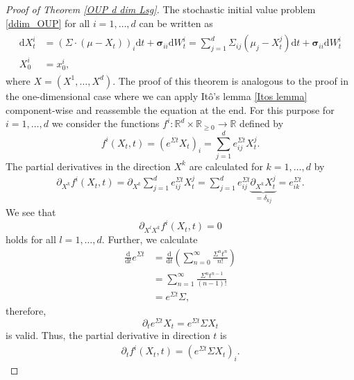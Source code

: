 \documentclass[11pt,titlepage]{article}
\newcommand{\R}{\mathbb{R}} %
\theoremstyle{definition}
\theoremstyle{remark}
\begin{document}
	\begin{proof}[Proof of Theorem \ref{OUP d dim Lsg}]
		The stochastic initial value problem 
		\ref{ddim_OUP} for all $i=1,\ldots,d$ can be written as
		\begin{align}
			\begin{split}
				\mathrm{d}X_t^i &= (\Sigma\cdot (\mu-X_t))_i\mathrm{d}t +\boldsymbol{\sigma}_{ii} \mathrm{d}W_t^i
				=\sum_{j=1}^d \Sigma_{ij}(\mu_j-X_t^j)\mathrm{d}t+\boldsymbol{\sigma}_{ii} \mathrm{d}W_t^i\\
				X_0^i&=x_0^i, \label{ddim_OUP_komponentenweise}
			\end{split}
		\end{align}
		where $X = (X^1,\ldots,X^d)$. 
		The proof of this theorem is analogous to the proof in the one-dimensional case where we can apply Itô's lemma \ref{Itos lemma} component-wise and reassemble the equation at the end. 
		For this purpose for $i=1,\ldots,d$ we consider the functions 
		$f^i:\R^d\times \R_{\geq 0}\to\R$ defined by 
		\[f^i(X_t,t)=(e^{\Sigma t}X_t)_i = \sum_{j=1}^d e^{\Sigma t}_{ij}X_t^j.\]
		The partial derivatives in the direction $X^k$ are calculated for $k=1,\ldots,d$ by
		\begin{align}
			\partial_{X^k}f^i(X_t,t)=\partial_{X^k}\sum_{j=1}^d e^{\Sigma t}_{ij}X_t^j
			=\sum_{j=1}^d e^{\Sigma t}_{ij}\underbrace{\partial_{X^k}X_t^j}_{=\delta_{kj}}
			=e^{\Sigma t}_{ik}. \label{ito_part_abl1}
		\end{align}
		We see that
		\[\partial_{X^l X^k}f^i(X_t,t)=0\]
		holds for all $l=1,\ldots,d$. Further, we calculate
		\begin{align*}
			\frac{\mathrm{d}}{\mathrm{d}t} e^{\Sigma t} &= \frac{\mathrm{d}}{\mathrm{d}t} \left(\sum_{n=0}^{\infty} \frac{\Sigma^n t^n}{n!}\right) \\
			&= \sum_{n=1}^{\infty} \frac{\Sigma^n t^{n-1}}{(n-1)!} \\
			&= e^{\Sigma t}\Sigma,
		\end{align*}
		therefore, 
		\[\partial_t e^{\Sigma t}X_t = e^{\Sigma t}\Sigma X_t\]
		is valid. Thus, the partial derivative in direction $t$ is
		\begin{align}
			\partial_t f^i(X_t,t) = (e^{\Sigma t}\Sigma X_t)_i. \label{ito_part_abl2}
		\end{align}
		

\end{proof}
\end{document}
